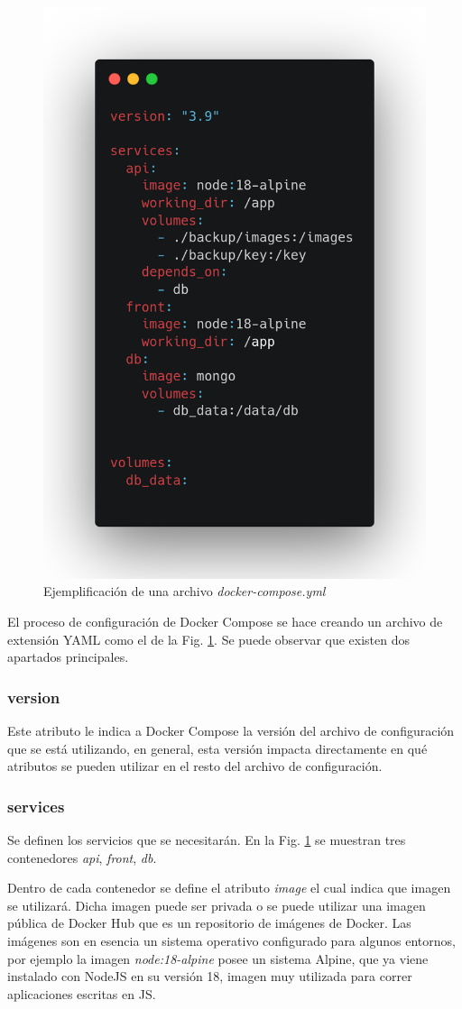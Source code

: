 \begin{figure}[bth]
    \centering
    \includegraphics[width=.5\textwidth]{imgs/docker-compose.png}
    \caption{Ejemplificación de una archivo \textit{docker-compose.yml}}
    \label{fig:docker-compose-yml}
\end{figure}

El proceso de configuración de Docker Compose se hace creando un archivo de extensión YAML como el de la Fig. \ref{fig:docker-compose-yml}. Se puede observar que existen dos apartados principales.

\subsubsection{version}

Este atributo le indica a Docker Compose la versión del archivo de configuración que se está utilizando, en general, esta versión impacta directamente en qué atributos se pueden utilizar en el resto del archivo de configuración.

\subsubsection{services}

Se definen los servicios que se necesitarán. En la Fig. \ref{fig:docker-compose-yml} se muestran tres contenedores \textit{api}, \textit{front}, \textit{db}.

Dentro de cada contenedor se define el atributo \textit{image} el cual indica que imagen se utilizará. Dicha imagen puede ser privada o  se puede utilizar una imagen pública de Docker Hub que es un repositorio de imágenes de Docker.
Las imágenes son en esencia un sistema operativo configurado para algunos entornos, por ejemplo la imagen \textit{node:18-alpine} posee un sistema Alpine, que ya viene instalado con NodeJS en su versión 18, imagen muy utilizada para correr aplicaciones escritas en JS.

